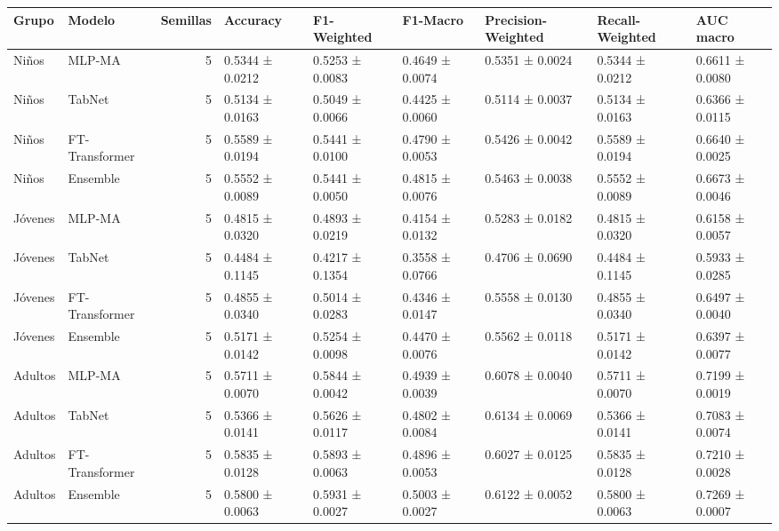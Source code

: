 \begin{tabular}{llrllllll}
\toprule
Grupo & Modelo & Semillas & Accuracy & F1-Weighted & F1-Macro & Precision-Weighted & Recall-Weighted & AUC macro \\
\midrule
Niños & MLP-MA & 5 & 0.5344 ± 0.0212 & 0.5253 ± 0.0083 & 0.4649 ± 0.0074 & 0.5351 ± 0.0024 & 0.5344 ± 0.0212 & 0.6611 ± 0.0080 \\
Niños & TabNet & 5 & 0.5134 ± 0.0163 & 0.5049 ± 0.0066 & 0.4425 ± 0.0060 & 0.5114 ± 0.0037 & 0.5134 ± 0.0163 & 0.6366 ± 0.0115 \\
Niños & FT-Transformer & 5 & 0.5589 ± 0.0194 & 0.5441 ± 0.0100 & 0.4790 ± 0.0053 & 0.5426 ± 0.0042 & 0.5589 ± 0.0194 & 0.6640 ± 0.0025 \\
Niños & Ensemble & 5 & 0.5552 ± 0.0089 & 0.5441 ± 0.0050 & 0.4815 ± 0.0076 & 0.5463 ± 0.0038 & 0.5552 ± 0.0089 & 0.6673 ± 0.0046 \\
Jóvenes & MLP-MA & 5 & 0.4815 ± 0.0320 & 0.4893 ± 0.0219 & 0.4154 ± 0.0132 & 0.5283 ± 0.0182 & 0.4815 ± 0.0320 & 0.6158 ± 0.0057 \\
Jóvenes & TabNet & 5 & 0.4484 ± 0.1145 & 0.4217 ± 0.1354 & 0.3558 ± 0.0766 & 0.4706 ± 0.0690 & 0.4484 ± 0.1145 & 0.5933 ± 0.0285 \\
Jóvenes & FT-Transformer & 5 & 0.4855 ± 0.0340 & 0.5014 ± 0.0283 & 0.4346 ± 0.0147 & 0.5558 ± 0.0130 & 0.4855 ± 0.0340 & 0.6497 ± 0.0040 \\
Jóvenes & Ensemble & 5 & 0.5171 ± 0.0142 & 0.5254 ± 0.0098 & 0.4470 ± 0.0076 & 0.5562 ± 0.0118 & 0.5171 ± 0.0142 & 0.6397 ± 0.0077 \\
Adultos & MLP-MA & 5 & 0.5711 ± 0.0070 & 0.5844 ± 0.0042 & 0.4939 ± 0.0039 & 0.6078 ± 0.0040 & 0.5711 ± 0.0070 & 0.7199 ± 0.0019 \\
Adultos & TabNet & 5 & 0.5366 ± 0.0141 & 0.5626 ± 0.0117 & 0.4802 ± 0.0084 & 0.6134 ± 0.0069 & 0.5366 ± 0.0141 & 0.7083 ± 0.0074 \\
Adultos & FT-Transformer & 5 & 0.5835 ± 0.0128 & 0.5893 ± 0.0063 & 0.4896 ± 0.0053 & 0.6027 ± 0.0125 & 0.5835 ± 0.0128 & 0.7210 ± 0.0028 \\
Adultos & Ensemble & 5 & 0.5800 ± 0.0063 & 0.5931 ± 0.0027 & 0.5003 ± 0.0027 & 0.6122 ± 0.0052 & 0.5800 ± 0.0063 & 0.7269 ± 0.0007 \\
\bottomrule
\end{tabular}
